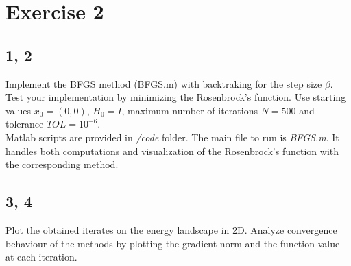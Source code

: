 \documentclass[unicode,11pt,a4paper,oneside,numbers=endperiod,openany]{scrartcl}
\newcommand{\myvec}[1]{\begin{bmatrix} #1 \end{bmatrix}}
\begin{document}

\section*{Exercise 2}

\subsection*{1, 2}
Implement the BFGS method (BFGS.m) with backtraking for the step size $\beta$. 
Test your implementation by minimizing the Rosenbrock's function. 
Use starting values $x_0 = (0, 0)$, 
$H_0 = I$, 
maximum number of iterations $N = 500$ and tolerance $TOL = 10^{-6}$.
\\\newline
Matlab scripts are provided in \textit{/code} folder.
The main file to run is \textit{BFGS.m}.
It handles both computations and visualization of the Rosenbrock's function with the corresponding method.

\subsection*{3, 4}
Plot the obtained iterates on the energy landscape in 2D.
Analyze convergence behaviour of the methods by plotting the gradient norm and the function
value at each iteration.
\end{document}
